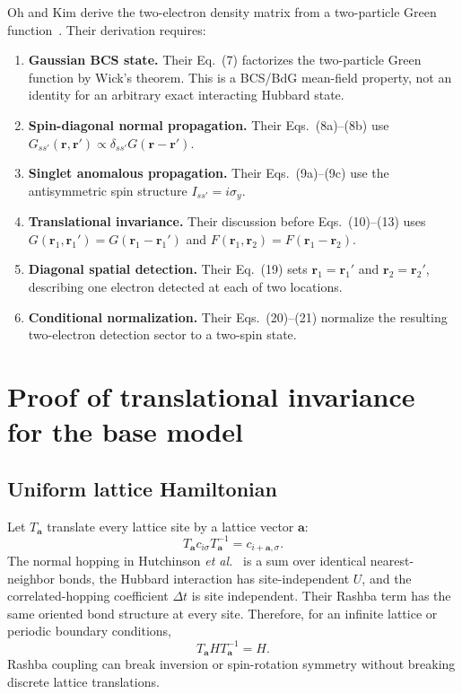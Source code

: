 \documentclass[11pt]{article}
\begin{document}
Oh and Kim derive the two-electron density matrix from a two-particle Green function~\cite{OhKim}. Their derivation requires:
\begin{enumerate}
    \item \textbf{Gaussian BCS state.} Their Eq.~(7) factorizes the two-particle Green function by Wick's theorem. This is a BCS/BdG mean-field property, not an identity for an arbitrary exact interacting Hubbard state.
    \item \textbf{Spin-diagonal normal propagation.} Their Eqs.~(8a)--(8b) use $G_{ss'}(\mathbf r,\mathbf r')\propto\delta_{ss'}G(\mathbf r-\mathbf r')$.
    \item \textbf{Singlet anomalous propagation.} Their Eqs.~(9a)--(9c) use the antisymmetric spin structure $I_{ss'}=i\sigma_y$.
    \item \textbf{Translational invariance.} Their discussion before Eqs.~(10)--(13) uses $G(\mathbf r_1,\mathbf r_1')=G(\mathbf r_1-\mathbf r_1')$ and $F(\mathbf r_1,\mathbf r_2)=F(\mathbf r_1-\mathbf r_2)$.
    \item \textbf{Diagonal spatial detection.} Their Eq.~(19) sets $\mathbf r_1=\mathbf r_1'$ and $\mathbf r_2=\mathbf r_2'$, describing one electron detected at each of two locations.
    \item \textbf{Conditional normalization.} Their Eqs.~(20)--(21) normalize the resulting two-electron detection sector to a two-spin state.
\end{enumerate}

\section{Proof of translational invariance for the base model}

\subsection{Uniform lattice Hamiltonian}

Let $T_{\mathbf a}$ translate every lattice site by a lattice vector $\mathbf a$:
\begin{equation}
T_{\mathbf a}c_{i\sigma}T_{\mathbf a}^{-1}=c_{i+\mathbf a,\sigma}.
\end{equation}
The normal hopping in Hutchinson \emph{et al.}~\cite{Hutchinson} is a sum over identical nearest-neighbor bonds, the Hubbard interaction has site-independent $U$, and the correlated-hopping coefficient $\Delta t$ is site independent. Their Rashba term has the same oriented bond structure at every site. Therefore, for an infinite lattice or periodic boundary conditions,
\begin{equation}
T_{\mathbf a}HT_{\mathbf a}^{-1}=H.
\end{equation}
Rashba coupling can break inversion or spin-rotation symmetry without breaking discrete lattice translations.
\end{document}
